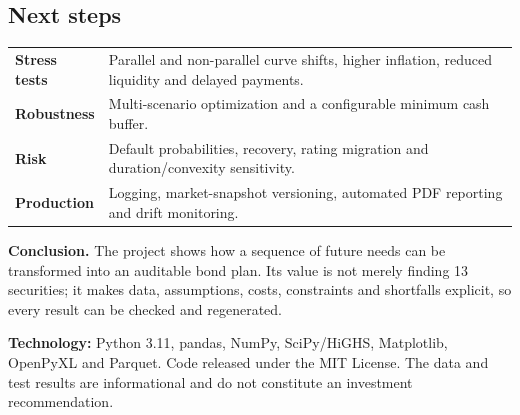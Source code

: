 \documentclass[10pt,a4paper]{article}
\begin{document}
\subsection{Next steps}
\begin{tabularx}{\textwidth}{>{\bfseries}p{32mm}X}
Stress tests & Parallel and non-parallel curve shifts, higher inflation, reduced liquidity and delayed payments.\\
Robustness & Multi-scenario optimization and a configurable minimum cash buffer.\\
Risk & Default probabilities, recovery, rating migration and duration/convexity sensitivity.\\
Production & Logging, market-snapshot versioning, automated PDF reporting and drift monitoring.\\
\end{tabularx}

\vfill
\colorbox{paneldark}{\parbox{0.965\textwidth}{\vspace{2mm}
\textbf{Conclusion.} The project shows how a sequence of future needs can be transformed into an auditable bond plan. Its value is not merely finding 13 securities; it makes data, assumptions, costs, constraints and shortfalls explicit, so every result can be checked and regenerated.\vspace{2mm}}}

\vspace{4mm}
{\small\textbf{Technology:} Python 3.11, pandas, NumPy, SciPy/HiGHS, Matplotlib, OpenPyXL and Parquet. Code released under the MIT License. The data and test results are informational and do not constitute an investment recommendation.}
\end{document}
